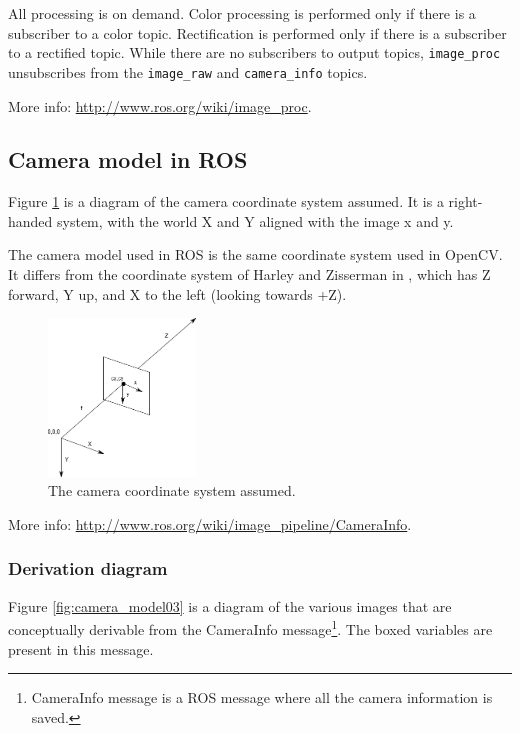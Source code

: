 All processing is on demand. Color processing is performed only if there is a subscriber to a color topic. Rectification is performed only if there is a subscriber to a rectified topic. While there are no subscribers to output topics, \texttt{image\_proc} unsubscribes from the \texttt{image\_raw} and \texttt{camera\_info} topics.

More info: \url{http://www.ros.org/wiki/image_proc}.


\subsection{Camera model in ROS}

Figure \ref{fig:camera_model02} is a diagram of the camera coordinate system assumed. It is a right-handed system, with the world X and Y aligned with the image x and y.

The camera model used in ROS is the same coordinate system used in OpenCV. It differs from the coordinate system of Harley and Zisserman in \cite{HZ2}, which has Z forward, Y up, and X to the left (looking towards +Z).

\begin{figure}[!htbp]
 \centering
 \includegraphics[width=0.35\textwidth]{images/camera_model02.png}
 \caption{The camera coordinate system assumed.}
 \label{fig:camera_model02}
\end{figure}

More info: \url{http://www.ros.org/wiki/image_pipeline/CameraInfo}.

\subsubsection{Derivation diagram}

Figure \ref{fig:camera_model03} is a diagram of the various images that are conceptually derivable from the CameraInfo message\footnote{CameraInfo message is a ROS message where all the camera information is saved.}. The boxed variables are present in this message.

